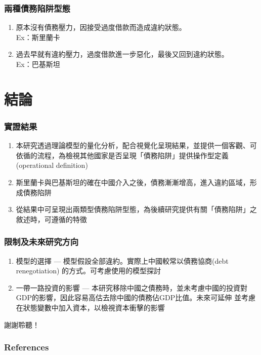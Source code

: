 \documentclass[mathserif]{beamer}
\begin{document}
    \begin{frame}
        \frametitle{兩種債務陷阱型態}

       \begin{enumerate}
        \item 原本沒有債務壓力，因接受過度借款而造成違約狀態。\\Ex：斯里蘭卡
        \item 過去早就有違約壓力，過度借款進一步惡化，最後又回到違約狀態。\\Ex：巴基斯坦
       \end{enumerate}

    \end{frame}
    \section{結論}
    \begin{frame}
        \frametitle{實證結果}

        \begin{enumerate}
            \item 本研究透過理論模型的量化分析，配合視覺化呈現結果，並提供一個客觀、可依循的流程，為檢視其他國家是否呈現「債務陷阱」提供操作型定義 (operational definition)
            \item 斯里蘭卡與巴基斯坦的確在中國介入之後，債務漸漸增高，進入違約區域，形成債務陷阱
            \item 從結果中可呈現出兩類型債務陷阱型態，為後續研究提供有關「債務陷阱」之敘述時，可遵循的特徵
        \end{enumerate}

    \end{frame}

    \begin{frame}
        \frametitle{限制及未來研究方向}
            \begin{enumerate}
                \item 模型的選擇 --- 模型假設全部違約。實際上中國較常以債務協商(debt renegotiation) 的方式。可考慮使用\citet{Yue-10}的模型探討
                \item 一帶一路投資的影響 --- 本研究移除中國之債務時，並未考慮中國的投資對GDP的影響，因此容易高估去除中國的債務佔GDP比值。未來可延伸 \citet{Mendoza-Yue-12}並考慮在狀態變數中加入資本，以檢視資本衝擊的影響
            \end{enumerate}

    \end{frame}

    \begin{frame}
        \begin{center}
            \Large
            謝謝聆聽！
        \end{center}    
    \end{frame}

    \appendix
    \begin{frame}[allowframebreaks]
            \frametitle{References}
            
            
    \end{frame}
\end{document}
